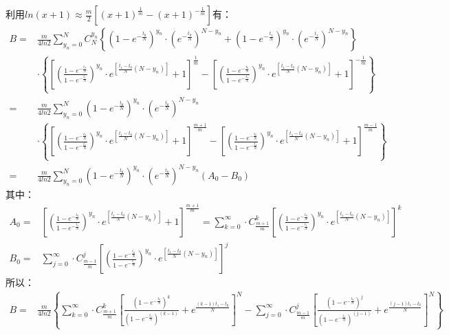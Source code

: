 \documentclass[12pt]{article}
\begin{document}
利用$ln(x+1)\approx\frac{m}{2}\left[(x+1)^{\frac{1}{m}}-(x+1)^{-\frac{1}{m}}\right]$有：
\begin{equation*}
    \begin{aligned}
       B=&\frac{m}{4ln2}\sum\limits_{y_n=0}^NC_N^{y_n}\left\{\left(1-e^{-\frac{t_0}{N}}\right)^{y_n}·\left(e^{-\frac{t_0}{N}}\right)^{N-y_n}+\left(1-e^{-\frac{t_1}{N}}\right)^{y_n}·\left(e^{-\frac{t_1}{N}}\right)^{N-y_n}\right\} \\
       &·\left\{\left[\left(\frac{1-e^{-\frac{t_0}{N}}}{1-e^{-\frac{t_1}{N}}}\right)^{y_n}·e^{[\frac{t_1-t_0}{N}(N-y_n)]}+1\right]^{\frac{1}{m}}-\left[\left(\frac{1-e^{-\frac{t_0}{N}}}{1-e^{-\frac{t_1}{N}}}\right)^{y_n}·e^{[\frac{t_1-t_0}{N}(N-y_n)]}+1\right]^{-\frac{1}{m}}\right\} \\
       =& \frac{m}{4ln2}\sum\limits_{y_n=0}^N\left(1-e^{-\frac{t_0}{N}}\right)^{y_n}·\left(e^{-\frac{t_0}{N}}\right)^{N-y_n} \\
       &·\left\{\left[\left(\frac{1-e^{-\frac{t_0}{N}}}{1-e^{-\frac{t_1}{N}}}\right)^{y_n}·e^{[\frac{t_1-t_0}{N}(N-y_n)]}+1\right]^{\frac{m+1}{m}}-\left[\left(\frac{1-e^{-\frac{t_0}{N}}}{1-e^{-\frac{t_1}{N}}}\right)^{y_n}·e^{[\frac{t_1-t_0}{N}(N-y_n)]}+1\right]^{\frac{m-1}{m}}\right\} \\
       =& \frac{m}{4ln2}\sum\limits_{y_n=0}^N\left(1-e^{-\frac{t_0}{N}}\right)^{y_n}·\left(e^{-\frac{t_0}{N}}\right)^{N-y_n}(A_0-B_0)
    \end{aligned}
\end{equation*}
其中：
\begin{equation*}
    \begin{aligned}
       A_0=&\left[\left(\frac{1-e^{-\frac{t_0}{N}}}{1-e^{-\frac{t_1}{N}}}\right)^{y_n}·e^{[\frac{t_1-t_0}{N}(N-y_n)]}+1\right]^{\frac{m+1}{m}}=\sum\limits_{k=0}^\infty·C_{\frac{m+1}{m}}^k\left[\left(\frac{1-e^{-\frac{t_0}{N}}}{1-e^{-\frac{t_1}{N}}}\right)^{y_n}·e^{[\frac{t_1-t_0}{N}(N-y_n)]}\right]^k \\
       B_0=&\sum\limits_{j=0}^\infty·C_{\frac{m-1}{m}}^j\left[\left(\frac{1-e^{-\frac{t_0}{N}}}{1-e^{-\frac{t_1}{N}}}\right)^{y_n}·e^{[\frac{t_1-t_0}{N}(N-y_n)]}\right]^j
    \end{aligned}
\end{equation*}
所以：
\begin{equation*}
    \begin{aligned}
       B=&\frac{m}{4ln2}\left\{\sum\limits_{k=0}^\infty·C_{\frac{m+1}{m}}^k\left[\frac{(1-e^{-\frac{t_0}{N}})^k}{(1-e^{-\frac{t_1}{N}})^{(k-1)}}+e^{\frac{(k-1)t_1-t_0}{N}}\right]^N-\sum\limits_{j=0}^\infty·C_{\frac{m-1}{m}}^j\left[\frac{(1-e^{-\frac{t_0}{N}})^j}{(1-e^{-\frac{t_1}{N}})^{(j-1)}}+e^{\frac{(j-1)t_1-t_0}{N}}\right]^N\right\}
    \end{aligned}
\end{equation*}
\end{document}
